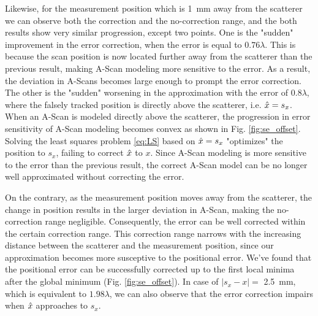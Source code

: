 Likewise, for the measurement position which is \SI{1}{\milli \metre} away from the scatterer we can observe both the correction and the no-correction range, and the both results show very similar progression, except two points. One is the "sudden" improvement in the error correction, when the error is equal to $0.76 \lambda$. This is because the scan position is now located further away from the scatterer than the previous result, making A-Scan modeling more sensitive to the error. As a result, the deviation in A-Scans becomes large enough to prompt the error correction. The other is the "sudden" worsening in the approximation with the error of $0.8 \lambda$, where the falsely tracked position is directly above the scatterer, i.e. $\hat{x} = s_{x}$. When an A-Scan is modeled directly above the scatterer, the progression in error sensitivity of A-Scan modeling becomes convex  as shown in Fig. \ref{fig:se_offset}. Solving the least squares problem \eqref{eq:LS} based on $\hat{x} = s_{x}$ "optimizes" the position to $s_{x}$, failing to correct $\hat{x}$ to $x$. Since A-Scan modeling is more sensitive to the error than the previous result, the correct A-Scan model can be no longer well approximated without correcting the error. \par

On the contrary, as the measurement position moves away from the scatterer, the change in position results in the larger deviation in A-Scan, making the no-correction range negligible. Consequently, the error can be well corrected within the certain correction range. This correction range narrows with the increasing distance between the scatterer and the measurement position, since our approximation becomes more susceptive to the positional error. We've found that the positional error can be successfully corrected up to the first local minima after the global minimum (Fig. \ref{fig:se_offset}). In case of $| s_{x} - x| =$ \SI{2.5}{\milli \metre}, which is equivalent to $1.98 \lambda$, we can also observe that the error correction impairs when $\hat{x}$ approaches to $s_{x}$. \par

